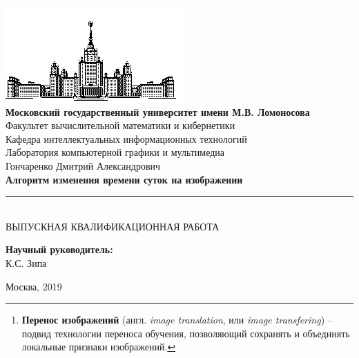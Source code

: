 \documentclass[11pt,a4paper]{extarticle}
\begin{document}
\begin{titlepage}
	\begin{centering}
		\includegraphics{img/msu}\\
		\large{
			\textbf{Московский государственный университет имени М.В. Ломоносова}\\
			Факультет вычислительной математики и кибернетики\\
			Кафедра интеллектуальных информационных технологий\\
			Лаборатория компьютерной графики и мультимедиа\\[4cm]
		}
		\Large{
			Гончаренко Дмитрий Александрович\\[0.9cm]
		}
		\Large{
			\textbf{Алгоритм изменения времени суток на изображении}\\
		}
		\rule[0.3cm]{14cm}{0.02cm}\\[1cm]
		\large{
			ВЫПУСКНАЯ КВАЛИФИКАЦИОННАЯ РАБОТА\\[4cm]
		}
	\end{centering}
	\begin{flushright}
		\large{
			\textbf{Научный руководитель:}\\ К.С. Зипа\\
		}
	\end{flushright}
	\begin{center}
		\vfill
		\large{
			Москва, 2019
		}
	\end{center}
\end{titlepage}

\begin{abstract}
	Алгоритм изменения времени суток на изображении относится к классу задач машинного обучения по \textit{переносу
	изображений}\footnote{
		\textbf{Перенос изображений} (англ. \textit{image translation}, или \textit{image transfering})
		-- подвид технологии переноса обучения, позволяющий сохранять и объединять локальные признаки изображений.
	}.
	Данная сфера значительное продвинулась благодаря современным вычислительным возможностям, в частности переносе обучения на графические процессоры, GPU.
	За последние несколько лет появилось немало исследовательских работ на тему переноса изображений, стилей и колоризации.
	В данной работе рассматриваются современные подходы к переносу изображений на примере изменения времени суток на изображении.
	Проводится описание нейросетевых моделей и сравнительный анализ серии экспериментов обучения.
\end{abstract}
\end{document}
